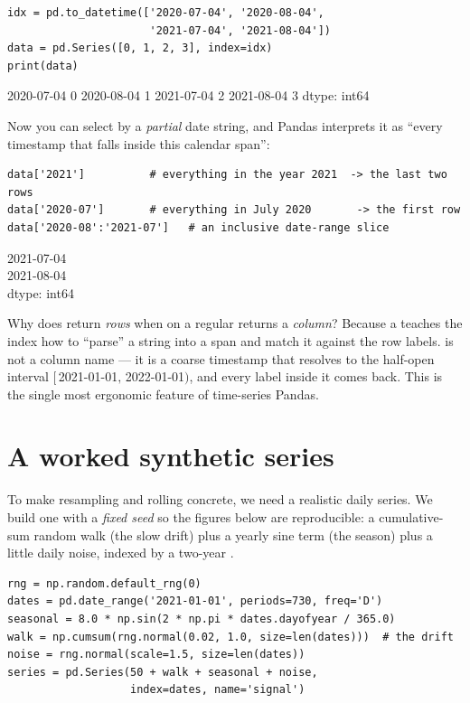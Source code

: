 \documentclass[11pt]{article}
\begin{document}
\begin{lstlisting}
idx = pd.to_datetime(['2020-07-04', '2020-08-04',
                      '2021-07-04', '2021-08-04'])
data = pd.Series([0, 1, 2, 3], index=idx)
print(data)
\end{lstlisting}

\begin{outblock}
2020-07-04    0
2020-08-04    1
2021-07-04    2
2021-08-04    3
dtype: int64
\end{outblock}

Now you can select by a \emph{partial} date string, and Pandas interprets it as ``every timestamp that falls inside this calendar span'':

\begin{lstlisting}
data['2021']          # everything in the year 2021  -> the last two rows
data['2020-07']       # everything in July 2020       -> the first row
data['2020-08':'2021-07']   # an inclusive date-range slice
\end{lstlisting}

\begin{outbox}
2021-07-04  \\
2021-08-04  \\
dtype: int64
\end{outbox}

\begin{intuition}
Why does  return \emph{rows} when  on a regular  returns a \emph{column}? Because a  teaches the index how to ``parse'' a string into a span and match it against the row labels.  is not a column name --- it is a coarse timestamp that resolves to the half-open interval $[\,$2021-01-01$,\,$2022-01-01$)$, and every label inside it comes back. This is the single most ergonomic feature of time-series Pandas.
\end{intuition}

\section{A worked synthetic series}

To make resampling and rolling concrete, we need a realistic daily series. We build one with a \emph{fixed seed} so the figures below are reproducible: a cumulative-sum random walk (the slow drift) plus a yearly sine term (the season) plus a little daily noise, indexed by a two-year .

\begin{lstlisting}
rng = np.random.default_rng(0)
dates = pd.date_range('2021-01-01', periods=730, freq='D')
seasonal = 8.0 * np.sin(2 * np.pi * dates.dayofyear / 365.0)
walk = np.cumsum(rng.normal(0.02, 1.0, size=len(dates)))  # the drift
noise = rng.normal(scale=1.5, size=len(dates))
series = pd.Series(50 + walk + seasonal + noise,
                   index=dates, name='signal')
\end{lstlisting}
\end{document}
